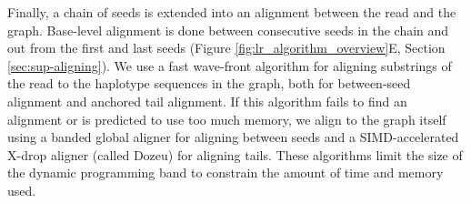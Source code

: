 \documentclass[11pt]{ucscthesis}
\begin{document}
Finally, a chain of seeds is extended into an alignment between the read and the graph.
Base-level alignment is done between consecutive seeds in the chain and out from the first and last seeds (Figure \ref{fig:lr_algorithm_overview}E, Section \ref{sec:sup-aligning}).
We use a fast wave-front algorithm \citep{marco-sola_fast_wfa_2021,eizenga_wfa_2022,marco-sola_wfa_2023} for aligning substrings of the read to the haplotype sequences in the graph, both for between-seed alignment and anchored tail alignment.  
If this algorithm fails to find an alignment or is predicted to use too much memory, we align to the graph itself using a banded global aligner for aligning between seeds and a SIMD-accelerated X-drop aligner (called Dozeu) for aligning tails.
These algorithms limit the size of the dynamic programming band to constrain the amount of time and memory used.
\end{document}
